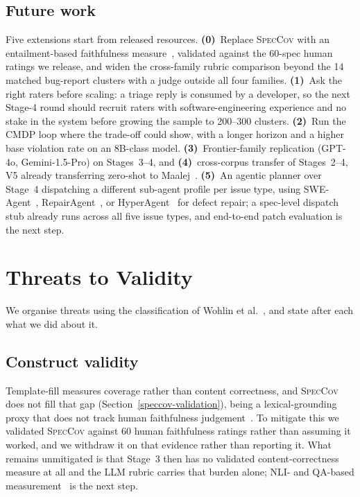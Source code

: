 \documentclass[preprint,12pt]{elsarticle}
\begin{document}
\subsection{Future work}\label{future-work}
Five extensions start from released resources.
\textbf{(0)}~Replace \textsc{SpecCov} with an entailment-based faithfulness
measure~\cite{laban2022summac, honovich2022true, durmus2020feqa}, validated against the 60-spec
human ratings we release, and widen the cross-family rubric comparison beyond the 14 matched
bug-report clusters with a judge outside all four families.
\textbf{(1)}~Ask the right raters before scaling: a triage reply is consumed by a developer, so
the next Stage-4 round should recruit raters with software-engineering experience and no stake in
the system before growing the sample to 200--300 clusters.
\textbf{(2)}~Run the CMDP loop where the trade-off could show, with a longer horizon and a
higher base violation rate on an 8B-class model.
\textbf{(3)}~Frontier-family replication (GPT-4o, Gemini-1.5-Pro) on Stages~3--4, and
\textbf{(4)}~cross-corpus transfer of Stages~2--4, V5 already transferring zero-shot to
Maalej~\cite{maalej2015bug}.
\textbf{(5)}~An agentic planner over Stage~4 dispatching a different sub-agent profile per issue
type, using SWE-Agent~\cite{yang2024swe}, RepairAgent~\cite{bouzenia2025repairagent}, or
HyperAgent~\cite{phan2024hyperagent} for defect repair; a spec-level dispatch stub already runs
across all five issue types, and end-to-end patch evaluation is the next step.

\section{Threats to Validity}\label{threats}
We organise threats using the classification of Wohlin et al.~\cite{wohlin2012experimentation},
and state after each what we did about it.

\subsection{Construct validity} Template-fill measures coverage rather than content correctness, and \textsc{SpecCov} does not fill that gap (Section~\ref{speccov-validation}), being a lexical-grounding proxy that does not track human faithfulness judgement~\cite{grusky2018newsroom, maynez2020faithfulness, kryscinski2020evaluating, ji2023survey}. To mitigate this we validated \textsc{SpecCov} against 60 human faithfulness ratings rather than assuming it worked, and we withdraw it on that evidence rather than reporting it. What remains unmitigated is that Stage~3 then has no validated content-correctness measure at all and the LLM rubric carries that burden alone; NLI- and QA-based measurement~\cite{laban2022summac, honovich2022true, durmus2020feqa} is the next step.
\end{document}
